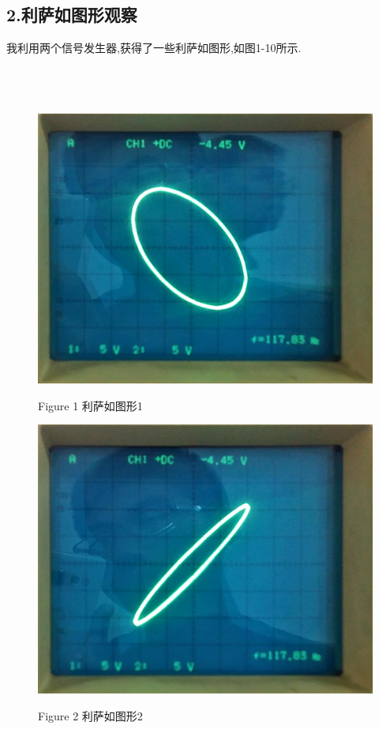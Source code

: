 \documentclass[a4paper,10pt,notitlepage]{report}
\begin{document}
\subsection*{2.利萨如图形观察}
	
	我利用两个信号发生器,获得了一些利萨如图形,如图1-10所示.	\\
	\\
	\\
	\\
	
\begin{figure}[htbp]
\centering

	\includegraphics[scale=.2]{L01.jpg}
	\begin{center}
		\scriptsize Figure 1 利萨如图形1
	\end{center}

\end{figure}
	
\begin{figure}[htbp]
\centering

	\includegraphics[scale=.2]{L02.jpg}
	\begin{center}
		\scriptsize Figure 2 利萨如图形2
	\end{center}

\end{figure}
	
\end{document}
